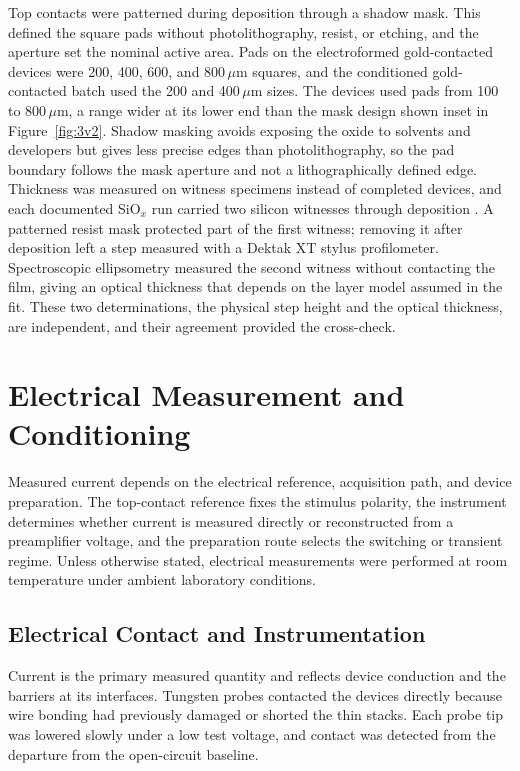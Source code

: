 \noindent Top contacts were patterned during deposition through a shadow mask. This defined the square pads without
photolithography, resist, or etching, and the aperture set the nominal active area. Pads on the electroformed
gold-contacted devices were 200, 400, 600, and 800\,$\mu$m squares, and the conditioned gold-contacted batch used the
200 and 400\,$\mu$m sizes. The  devices used pads from 100 to 800\,$\mu$m, a range wider at its lower end
than the mask design shown inset in Figure~\ref{fig:3v2}. Shadow masking avoids exposing the oxide to solvents and
developers but gives less precise edges than photolithography, so the pad boundary follows the mask aperture and not
a lithographically defined edge.\\

\noindent Thickness was measured on witness specimens instead of completed devices, and each documented SiO$_x$ run
carried two silicon witnesses through deposition \cite{cox2021nanoscale}. A patterned resist mask protected part of
the first witness; removing it after deposition left a step measured with a Dektak XT stylus profilometer.
Spectroscopic ellipsometry measured the second witness without contacting the film, giving an optical thickness that
depends on the layer model assumed in the fit. These two determinations, the physical step height and the
optical thickness, are independent, and their agreement provided the cross-check.

\section[Electrical Measurement and Conditioning]{Electrical Measurement and Conditioning}\label{sec:3elec}

\noindent Measured current depends on the electrical reference, acquisition path, and device preparation. The
top-contact reference fixes the stimulus polarity, the instrument determines whether current is measured directly or
reconstructed from a preamplifier voltage, and the preparation route selects the switching or transient regime.
Unless otherwise stated, electrical measurements were performed at room temperature under ambient laboratory
conditions.

\subsection[Electrical Contact and Instrumentation]{Electrical Contact and Instrumentation}

\noindent Current is the primary measured quantity and reflects device conduction and the barriers at its
interfaces. Tungsten probes contacted the devices directly because wire bonding had previously damaged or shorted
the thin stacks. Each probe tip was lowered slowly under a low test voltage, and contact was detected from the
departure from the open-circuit baseline.\\

